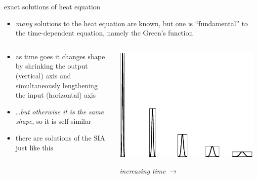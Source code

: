 \begin{frame}{exact solutions of heat equation}

\begin{itemize}
\item \emph{many} solutions to the heat equation are known, but one is ``fundamental'' to the time-dependent equation, namely the Green's function
\end{itemize}

\begin{columns}[b]
\begin{column}{0.5\textwidth}
\begin{itemize}
\small
\item as time goes it changes shape by shrinking the output (vertical) axis and simultaneously lengthening the input (horizontal) axis
\item \dots \emph{but otherwise it is the same shape}, so it is self-similar
\item there are solutions of the SIA just like this
\normalsize
\end{itemize}
\end{column}
\begin{column}{0.5\textwidth}
\begin{center}
\includegraphics[width=1.0\textwidth]{pdffigs/heatscaling}

\emph{increasing time} \Large $\to$
\end{center}
\end{column}
\end{columns}
\end{frame}


